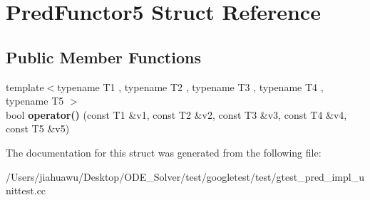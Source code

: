 \hypertarget{struct_pred_functor5}{}\section{Pred\+Functor5 Struct Reference}
\label{struct_pred_functor5}
\subsection*{Public Member Functions}
\begin{DoxyCompactItemize}
\item 
\mbox{\label{struct_pred_functor5_af9decf4d509848479ccdc4fe90129a06}} 
{\footnotesize template$<$typename T1 , typename T2 , typename T3 , typename T4 , typename T5 $>$ }\\bool {\bfseries operator()} (const T1 \&v1, const T2 \&v2, const T3 \&v3, const T4 \&v4, const T5 \&v5)
\end{DoxyCompactItemize}


The documentation for this struct was generated from the following file\+:\begin{DoxyCompactItemize}
\item 
/\+Users/jiahuawu/\+Desktop/\+O\+D\+E\+\_\+\+Solver/test/googletest/test/gtest\+\_\+pred\+\_\+impl\+\_\+unittest.\+cc\end{DoxyCompactItemize}

